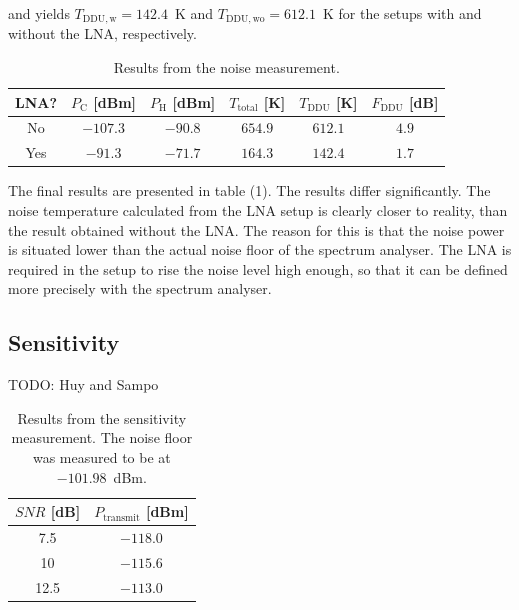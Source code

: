 \documentclass[a4paper, 12pt]{article}
\begin{document}
\noindent
and yields $T_{\mathrm{DDU, w}} = 142.4$~K and $T_{\mathrm{DDU, wo}} = 612.1$~K for the setups with and without the LNA, respectively.

\begin{table}[!h]
	\begin{center}
	\caption{Results from the noise measurement.}
	\label{t:noise}
	\renewcommand*{\arraystretch}{1.2}
	\begin{tabular}{cccccc}
	LNA? 			& $P_\mathrm{C}$ [dBm] 		& $P_\mathrm{H}$ [dBm]	& $T_\mathrm{total}$ [K] 	& $T_\mathrm{DDU}$ [K] 	& $F_\mathrm{DDU}$ [dB] \\
	\hline
	No				& $-107.3$					& $-90.8$				& $654.9$ 							& $612.1$ 						& $4.9$\\
	Yes				& $-91.3$					& $-71.7$				& $164.3$ 							& $142.4$ 						& $1.7$ 	
	\end{tabular}
	\end{center}
	\vspace*{-12pt}
\end{table}

\noindent
The final results are presented in table (1). The results differ significantly. The noise temperature calculated from the LNA setup is clearly closer to reality, than the result obtained without the LNA. The reason for this is that the noise power is situated lower than the actual noise floor of the spectrum analyser. The LNA is required in the setup to rise the noise level high enough, so that it can be defined more precisely with the spectrum analyser.

\subsection{Sensitivity}

TODO: Huy and Sampo

\begin{table}[!h]
	\begin{center}
	\caption{Results from the sensitivity measurement. The noise floor was measured to be at $-101.98$~dBm.}
	\label{t:sens}
	\renewcommand*{\arraystretch}{1.2}
	\begin{tabular}{cc}
	$\mathit{SNR}$ [dB] 			& $P_\mathrm{transmit}$ [dBm]  \\
	\hline
	7.5								& $-118.0$ 	\\
	10								& $-115.6$ 	\\
	12.5							& $-113.0$ 	
	\end{tabular}
	\end{center}
	\vspace*{-12pt}
\end{table}
\end{document}
